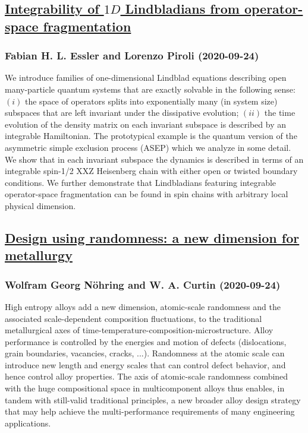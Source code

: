 \subsection*{\href{http://arxiv.org/abs/2009.11745v1}{Integrability of $1D$ Lindbladians from operator-space fragmentation}}
\subsubsection*{Fabian H. L. Essler and Lorenzo Piroli (2020-09-24)}
We introduce families of one-dimensional Lindblad equations describing open
many-particle quantum systems that are exactly solvable in the following sense:
$(i)$ the space of operators splits into exponentially many (in system size)
subspaces that are left invariant under the dissipative evolution; $(ii)$ the
time evolution of the density matrix on each invariant subspace is described by
an integrable Hamiltonian. The prototypical example is the quantum version of
the asymmetric simple exclusion process (ASEP) which we analyze in some detail.
We show that in each invariant subspace the dynamics is described in terms of
an integrable spin-1/2 XXZ Heisenberg chain with either open or twisted
boundary conditions. We further demonstrate that Lindbladians featuring
integrable operator-space fragmentation can be found in spin chains with
arbitrary local physical dimension.

\subsection*{\href{http://arxiv.org/abs/2009.11740v1}{Design using randomness: a new dimension for metallurgy}}
\subsubsection*{Wolfram Georg Nöhring and W. A. Curtin (2020-09-24)}
High entropy alloys add a new dimension, atomic-scale randomness and the
associated scale-dependent composition fluctuations, to the traditional
metallurgical axes of time-temperature-composition-microstructure. Alloy
performance is controlled by the energies and motion of defects (dislocations,
grain boundaries, vacancies, cracks, ...). Randomness at the atomic scale can
introduce new length and energy scales that can control defect behavior, and
hence control alloy properties. The axis of atomic-scale randomness combined
with the huge compositional space in multicomponent alloys thus enables, in
tandem with still-valid traditional principles, a new broader alloy design
strategy that may help achieve the multi-performance requirements of many
engineering applications.

